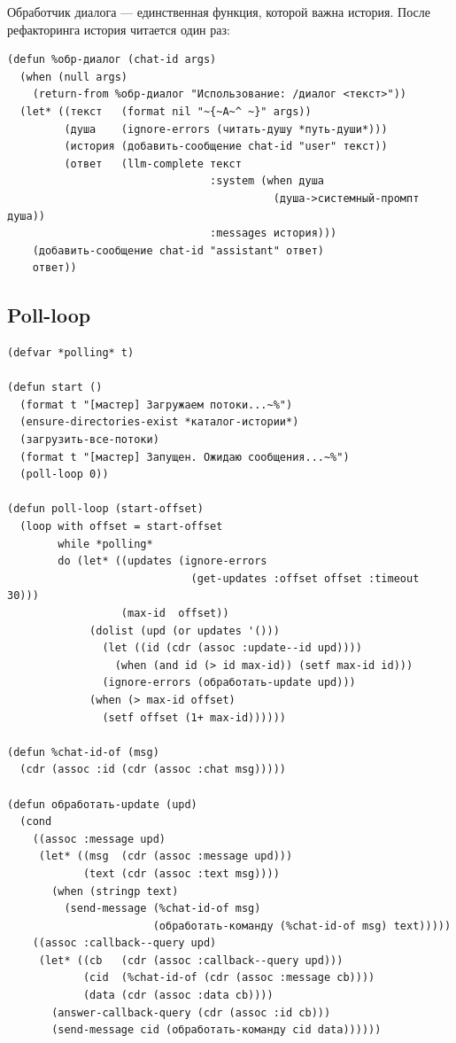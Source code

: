 \documentclass[11pt,a4paper]{article}
\begin{document}
Обработчик диалога — единственная функция, которой важна история. После рефакторинга история читается один раз:

\begin{lstlisting}[caption={мастер/cl/команды.lisp — /диалог}]
(defun %обр-диалог (chat-id args)
  (when (null args)
    (return-from %обр-диалог "Использование: /диалог <текст>"))
  (let* ((текст   (format nil "~{~A~^ ~}" args))
         (душа    (ignore-errors (читать-душу *путь-души*)))
         (история (добавить-сообщение chat-id "user" текст))
         (ответ   (llm-complete текст
                                :system (when душа
                                          (душа->системный-промпт душа))
                                :messages история)))
    (добавить-сообщение chat-id "assistant" ответ)
    ответ))
\end{lstlisting}

\subsection{Poll-loop}

\begin{lstlisting}[caption={мастер/cl/main.lisp}]
(defvar *polling* t)

(defun start ()
  (format t "[мастер] Загружаем потоки...~%")
  (ensure-directories-exist *каталог-истории*)
  (загрузить-все-потоки)
  (format t "[мастер] Запущен. Ожидаю сообщения...~%")
  (poll-loop 0))

(defun poll-loop (start-offset)
  (loop with offset = start-offset
        while *polling*
        do (let* ((updates (ignore-errors
                             (get-updates :offset offset :timeout 30)))
                  (max-id  offset))
             (dolist (upd (or updates '()))
               (let ((id (cdr (assoc :update--id upd))))
                 (when (and id (> id max-id)) (setf max-id id)))
               (ignore-errors (обработать-update upd)))
             (when (> max-id offset)
               (setf offset (1+ max-id))))))

(defun %chat-id-of (msg)
  (cdr (assoc :id (cdr (assoc :chat msg)))))

(defun обработать-update (upd)
  (cond
    ((assoc :message upd)
     (let* ((msg  (cdr (assoc :message upd)))
            (text (cdr (assoc :text msg))))
       (when (stringp text)
         (send-message (%chat-id-of msg)
                       (обработать-команду (%chat-id-of msg) text)))))
    ((assoc :callback--query upd)
     (let* ((cb   (cdr (assoc :callback--query upd)))
            (cid  (%chat-id-of (cdr (assoc :message cb))))
            (data (cdr (assoc :data cb))))
       (answer-callback-query (cdr (assoc :id cb)))
       (send-message cid (обработать-команду cid data))))))
\end{lstlisting}
\end{document}
